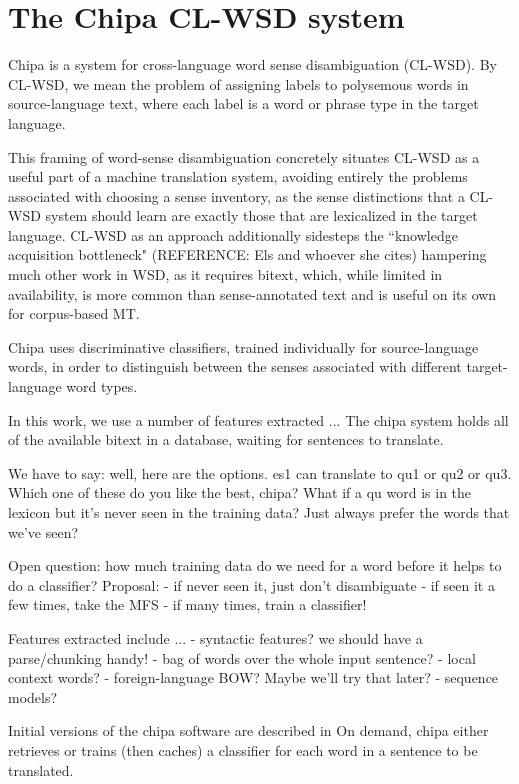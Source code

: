 \documentclass[10pt, a4paper]{article}
\begin{document}
\section{The Chipa CL-WSD system}
Chipa is a system for cross-language word sense disambiguation (CL-WSD). By
CL-WSD, we mean the problem of assigning labels to polysemous words in
source-language text, where each label is a word or phrase type in the target
language.

This framing of word-sense disambiguation concretely situates CL-WSD as a
useful part of a machine translation system, avoiding entirely the problems
associated with choosing a sense inventory, as the sense distinctions that a
CL-WSD system should learn are exactly those that are lexicalized in the target
language. CL-WSD as an approach additionally sidesteps the ``knowledge
acquisition bottleneck" (REFERENCE: Els and whoever she cites) hampering much
other work in WSD, as it requires bitext, which, while limited in availability,
is more common than sense-annotated text and is useful on its own for
corpus-based MT.

Chipa uses discriminative classifiers, trained individually for source-language
words, in order to distinguish between the senses associated with different
target-language word types.

In this work, we use a number of features extracted ...
The chipa system holds all of the available bitext in a database, waiting for
sentences to translate.

We have to say: well, here are the options. es1 can translate to qu1 or qu2 or
qu3. Which one of these do you like the best, chipa?
What if a qu word is in the lexicon but it's never seen in the training data?
Just always prefer the words that we've seen?


Open question: how much training data do we need for a word before it helps to
do a classifier?
Proposal:
- if never seen it, just don't disambiguate
- if seen it a few times, take the MFS
- if many times, train a classifier!



Features extracted include ...
- syntactic features? we should have a parse/chunking handy!
- bag of words over the whole input sentence?
- local context words?
- foreign-language BOW? Maybe we'll try that later?
- sequence models?




Initial versions of the chipa software are described in
\cite{rudnick-gasser:2013:HyTra}
On demand, chipa either retrieves or trains (then caches) a classifier
for each word in a sentence to be translated.
\end{document}
